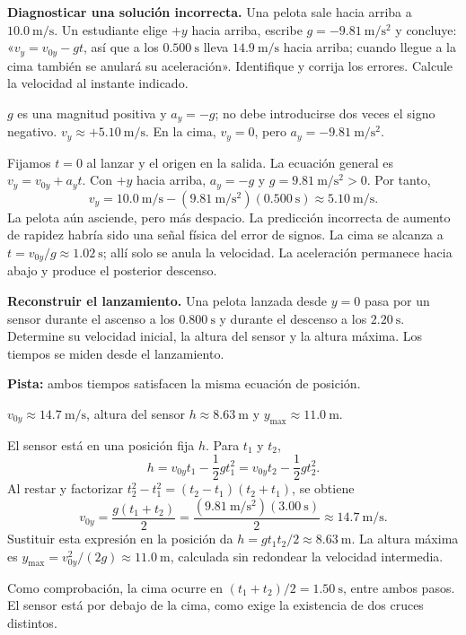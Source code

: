 \begin{ejercicio}
\textbf{Diagnosticar una solución incorrecta.} Una pelota sale hacia arriba a \(\SI{10.0}{\meter\per\second}\). Un estudiante elige \(+y\) hacia arriba, escribe \(g=-\SI{9.81}{\meter\per\second\squared}\) y concluye: «\(v_y=v_{0y}-gt\), así que a los \(\SI{0.500}{\second}\) lleva \(\SI{14.9}{\meter\per\second}\) hacia arriba; cuando llegue a la cima también se anulará su aceleración». Identifique y corrija los errores. Calcule la velocidad al instante indicado.
\end{ejercicio}
\begin{respuesta}
\(g\) es una magnitud positiva y \(a_y=-g\); no debe introducirse dos veces el signo negativo. \(v_y\approx+\SI{5.10}{\meter\per\second}\). En la cima, \(v_y=0\), pero \(a_y=-\SI{9.81}{\meter\per\second\squared}\).
\end{respuesta}
\begin{explicacion}
Fijamos \(t=0\) al lanzar y el origen en la salida. La ecuación general es \(v_y=v_{0y}+a_yt\). Con \(+y\) hacia arriba, \(a_y=-g\) y \(g=\SI{9.81}{\meter\per\second\squared}>0\). Por tanto,
\[ v_y=\SI{10.0}{\meter\per\second}-(\SI{9.81}{\meter\per\second\squared})(\SI{0.500}{\second})\approx\SI{5.10}{\meter\per\second}. \]
La pelota aún asciende, pero más despacio. La predicción incorrecta de aumento de rapidez habría sido una señal física del error de signos. La cima se alcanza a \(t=v_{0y}/g\approx\SI{1.02}{\second}\); allí solo se anula la velocidad. La aceleración permanece hacia abajo y produce el posterior descenso.
\end{explicacion}

\begin{ejercicio}
\textbf{Reconstruir el lanzamiento.} Una pelota lanzada desde \(y=0\) pasa por un sensor durante el ascenso a los \(\SI{0.800}{\second}\) y durante el descenso a los \(\SI{2.20}{\second}\). Determine su velocidad inicial, la altura del sensor y la altura máxima. Los tiempos se miden desde el lanzamiento.

\textbf{Pista:} ambos tiempos satisfacen la misma ecuación de posición.
\end{ejercicio}
\begin{respuesta}
\(v_{0y}\approx\SI{14.7}{\meter\per\second}\), altura del sensor \(h\approx\SI{8.63}{\meter}\) y \(y_{\max}\approx\SI{11.0}{\meter}\).
\end{respuesta}
\begin{explicacion}
El sensor está en una posición fija \(h\). Para \(t_1\) y \(t_2\),
\[ h=v_{0y}t_1-\frac12gt_1^2=v_{0y}t_2-\frac12gt_2^2. \]
Al restar y factorizar \(t_2^2-t_1^2=(t_2-t_1)(t_2+t_1)\), se obtiene
\[ v_{0y}=\frac{g(t_1+t_2)}2=\frac{(\SI{9.81}{\meter\per\second\squared})(\SI{3.00}{\second})}2\approx\SI{14.7}{\meter\per\second}. \]
Sustituir esta expresión en la posición da \(h=gt_1t_2/2\approx\SI{8.63}{\meter}\). La altura máxima es \(y_{\max}=v_{0y}^2/(2g)\approx\SI{11.0}{\meter}\), calculada sin redondear la velocidad intermedia.

Como comprobación, la cima ocurre en \((t_1+t_2)/2=\SI{1.50}{\second}\), entre ambos pasos. El sensor está por debajo de la cima, como exige la existencia de dos cruces distintos.
\end{explicacion}

